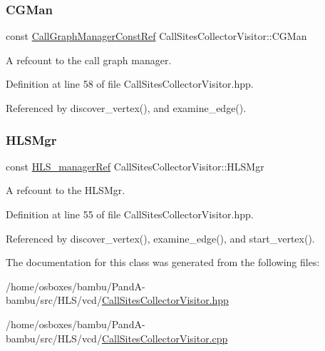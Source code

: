 \subsubsection{\texorpdfstring{C\+G\+Man}{CGMan}}
{\footnotesize\ttfamily const \hyperlink{call__graph__manager_8hpp_a19eec454bbf914c67fe80bcf28e4a90f}{Call\+Graph\+Manager\+Const\+Ref} Call\+Sites\+Collector\+Visitor\+::\+C\+G\+Man\hspace{0.3cm}{\ttfamily [private]}}



A refcount to the call graph manager. 



Definition at line 58 of file Call\+Sites\+Collector\+Visitor.\+hpp.



Referenced by discover\+\_\+vertex(), and examine\+\_\+edge().

\mbox{\label{classCallSitesCollectorVisitor_ac3a3780f5fefee14cb8e46c34a8a8f12}} 
\subsubsection{\texorpdfstring{H\+L\+S\+Mgr}{HLSMgr}}
{\footnotesize\ttfamily const \hyperlink{hls__manager_8hpp_acd3842b8589fe52c08fc0b2fcc813bfe}{H\+L\+S\+\_\+manager\+Ref} Call\+Sites\+Collector\+Visitor\+::\+H\+L\+S\+Mgr\hspace{0.3cm}{\ttfamily [private]}}



A refcount to the H\+L\+S\+Mgr. 



Definition at line 55 of file Call\+Sites\+Collector\+Visitor.\+hpp.



Referenced by discover\+\_\+vertex(), examine\+\_\+edge(), and start\+\_\+vertex().



The documentation for this class was generated from the following files\+:\begin{DoxyCompactItemize}
\item 
/home/osboxes/bambu/\+Pand\+A-\/bambu/src/\+H\+L\+S/vcd/\hyperlink{CallSitesCollectorVisitor_8hpp}{Call\+Sites\+Collector\+Visitor.\+hpp}\item 
/home/osboxes/bambu/\+Pand\+A-\/bambu/src/\+H\+L\+S/vcd/\hyperlink{CallSitesCollectorVisitor_8cpp}{Call\+Sites\+Collector\+Visitor.\+cpp}\end{DoxyCompactItemize}
